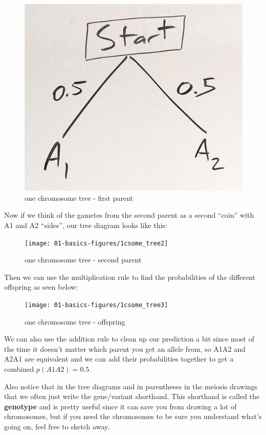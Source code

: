 \documentclass[]{book}
\theoremstyle{definition}
\theoremstyle{definition}
\theoremstyle{definition}
\theoremstyle{remark}
\begin{document}
\begin{figure}

{\centering \includegraphics[width=0.5\linewidth]{01-basics-figures/1csome_tree} 

}

\caption{one chromosome tree - first parent}\label{fig:gen-fig-4}
\end{figure}

Now if we think of the gametes from the second parent as a second
``coin'' with A1 and A2 ``sides'', our tree diagram looks like this:

\begin{figure}

{\centering \texttt{[image: 01-basics-figures/1csome\_tree2]} 

}

\caption{one chromosome tree - second parent}\label{fig:gen-fig-5}
\end{figure}

Then we can use the multiplication rule to find the probabilities of the
different offspring as seen below:

\begin{figure}

{\centering \texttt{[image: 01-basics-figures/1csome\_tree3]} 

}

\caption{one chromosome tree - offspring}\label{fig:gen-fig-6}
\end{figure}

We can also use the addition rule to clean up our prediction a bit since
most of the time it doesn't matter which parent you get an allele from,
so A1A2 and A2A1 are equivalent and we can add their probabilities
together to get a combined \(p(A1A2)=0.5\).

Also notice that in the tree diagrams and in parentheses in the meiosis
drawings that we often just write the gene/variant shorthand. This
shorthand is called the \textbf{genotype} and is pretty useful since it
can save you from drawing a lot of chromosomes, but if you need the
chromosomes to be sure you understand what's going on, feel free to
sketch away.
\end{document}
